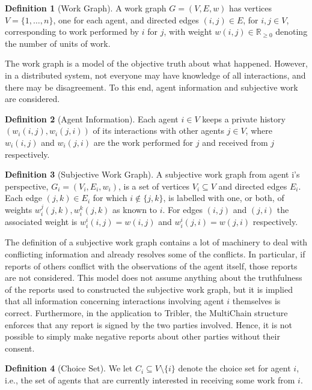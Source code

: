\documentclass[a4paper,11pt]{book}
\newcommand{\bb}{\mathbb}
\theoremstyle{definition}
\newtheorem{definition}{Definition}
\begin{document}
\begin{definition}[Work Graph]
    A work graph $G = (V, E, w)$ has vertices $V = \{1, \ldots, n\}$, one for each agent, and directed
    edges $(i, j) \in E$, for $i, j \in V$, corresponding to work performed by $i$ for $j$, with weight
    $w(i,j) \in \bb{R}_{\geq0}$ denoting the number of units of work.
    \label{def:work_graph}
\end{definition}

The work graph is a model of the objective truth about what happened. However, in a distributed system,
not everyone may have knowledge of all interactions, and there may be disagreement. To this end, agent
information and subjective work are considered.

\begin{definition}[Agent Information]
   Each agent $i \in V$ keeps a private history $(w_i(i,j), w_i(j, i))$ of its interactions with
   other agents $j \in V$, where $w_i(i,j)$ and $w_i(j,i)$ are the work performed for $j$ and
   received from $j$ respectively.
\end{definition}

\begin{definition}[Subjective Work Graph]
   A subjective work graph from agent i's perspective, $G_i = (V_i, E_i, w_i)$, is a set of vertices
   $V_i \subseteq V$ and directed edges $E_i$. Each edge $(j, k) \in E_i$ for which $i \notin \{j, k\}$,
   is labelled with one, or both, of weights $w^j_i(j, k), w_i^k(j, k)$ as known to $i$. For edges $(i,j)$
   and $(j,i)$ the associated weight is $w_i^i(i,j) = w(i,j)$ and $w_i^i(j, i) = w(j,i)$ respectively.
\end{definition}

The definition of a subjective work graph contains a lot of machinery to deal with conflicting information
and already resolves some of the conflicts. In particular, if reports of others conflict with the observations
of the agent itself, those reports are not considered. This model does not assume anything about the truthfulness
of the reports used to constructed the subjective work graph, but it is implied that all information concerning
interactions involving agent $i$ themselves is correct. Furthermore, in the application to Tribler, the
MultiChain structure enforces that any report is signed by the two parties involved. Hence, it is not possible
to simply make negative reports about other parties without their consent. 

\begin{definition}[Choice Set]
    We let $C_i \subseteq V \setminus \{i\}$ denote the choice set for agent $i$, i.e., the set of agents that
    are currently interested in receiving some work from $i$.
    \label{def:choice_set}
\end{definition}
\end{document}
